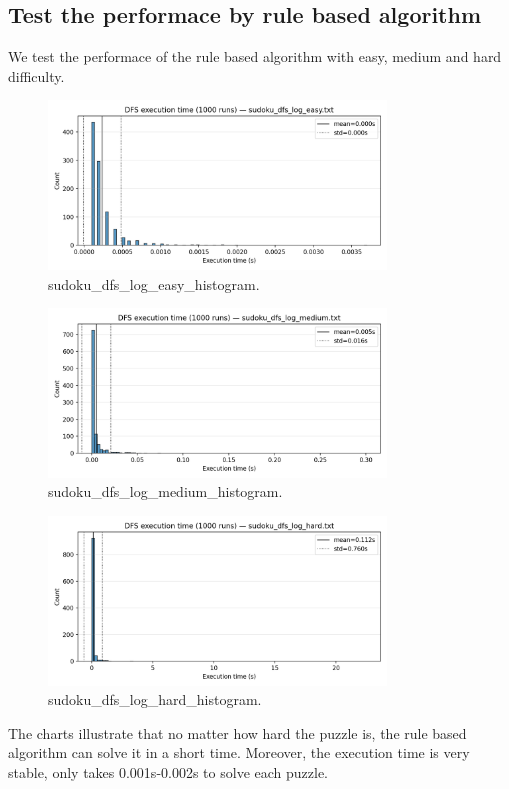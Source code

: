 \subsection{Test the performace by rule based algorithm}

We test the performace of the rule based algorithm with easy, medium and hard difficulty.

\begin{figure}[H]
\centering
\includegraphics[width=0.8\textwidth]{resources/sudoku_dfs_log_easy_histogram.png}
\caption{sudoku\_dfs\_log\_easy\_histogram.}
\label{fig:sudoku_dfs_log_easy_histogram}
\end{figure}

\begin{figure}[H]
\centering
\includegraphics[width=0.8\textwidth]{resources/sudoku_dfs_log_medium_histogram.png}
\caption{sudoku\_dfs\_log\_medium\_histogram.}
\label{fig:sudoku_dfs_log_medium_histogram}
\end{figure}

\begin{figure}[H]
\centering
\includegraphics[width=0.8\textwidth]{resources/sudoku_dfs_log_hard_histogram.png}
\caption{sudoku\_dfs\_log\_hard\_histogram.}
\label{fig:sudoku_dfs_log_hard_histogram}
\end{figure}

The charts illustrate that no matter how hard the puzzle is, the rule based algorithm can solve it in a short time. Moreover, the execution time is very stable, only takes 0.001s-0.002s to solve each puzzle.
